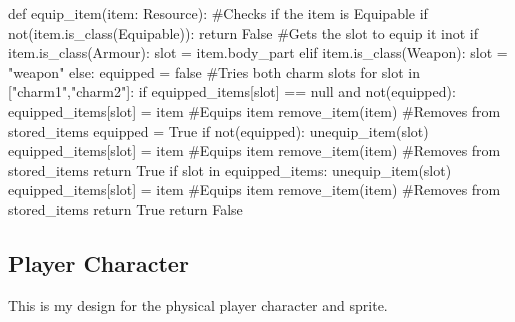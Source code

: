 \documentclass{article}
\begin{document}
        \begin{python}
def equip_item(item: Resource):
        #Checks if the item is Equipable
        if not(item.is_class(Equipable)):
                return False
        #Gets the slot to equip it inot
        if item.is_class(Armour):
                slot = item.body_part
        elif item.is_class(Weapon):
                slot = "weapon"
        else:
                equipped = false
                #Tries both charm slots
                for slot in ["charm1","charm2"]:
                        if equipped_items[slot] == null and not(equipped):
                                equipped_items[slot] = item #Equips item
                                remove_item(item) #Removes from stored_items
                                equipped = True
                if not(equipped):
                        unequip_item(slot)
                        equipped_items[slot] = item #Equips item
                        remove_item(item) #Removes from stored_items
                return True
        if slot in equipped_items:
                unequip_item(slot)
                equipped_items[slot] = item #Equips item
                remove_item(item) #Removes from stored_items
                return True
        return False      
        \end{python}
        \newpage
        \subsection{Player Character}
        This is my design for the physical player character and sprite.\\
\end{document}
